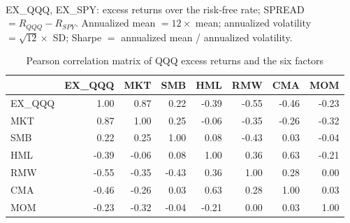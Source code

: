 
\begin{table}[htbp]\centering\small
\caption{Descriptive statistics of monthly returns, 1999-05 to 2026-09 (\%, monthly unless annualized)}
\\[3pt]
\footnotesize\raggedright EX\_QQQ, EX\_SPY: excess returns over the risk-free rate; SPREAD $=R_{QQQ}-R_{SPY}$. Annualized mean $=12\times$ mean; annualized volatility $=\sqrt{12}\times$ SD; Sharpe $=$ annualized mean / annualized volatility.
\end{table}
\begin{table}[htbp]\centering\small
\caption{Pearson correlation matrix of QQQ excess returns and the six factors}
\begin{tabular}{lrrrrrrr}
\toprule
 & EX\_QQQ & MKT & SMB & HML & RMW & CMA & MOM \\
\midrule
EX\_QQQ & 1.00 & 0.87 & 0.22 & -0.39 & -0.55 & -0.46 & -0.23 \\
MKT & 0.87 & 1.00 & 0.25 & -0.06 & -0.35 & -0.26 & -0.32 \\
SMB & 0.22 & 0.25 & 1.00 & 0.08 & -0.43 & 0.03 & -0.04 \\
HML & -0.39 & -0.06 & 0.08 & 1.00 & 0.36 & 0.63 & -0.21 \\
RMW & -0.55 & -0.35 & -0.43 & 0.36 & 1.00 & 0.28 & 0.00 \\
CMA & -0.46 & -0.26 & 0.03 & 0.63 & 0.28 & 1.00 & 0.03 \\
MOM & -0.23 & -0.32 & -0.04 & -0.21 & 0.00 & 0.03 & 1.00 \\
\bottomrule
\end{tabular}
\end{table}
